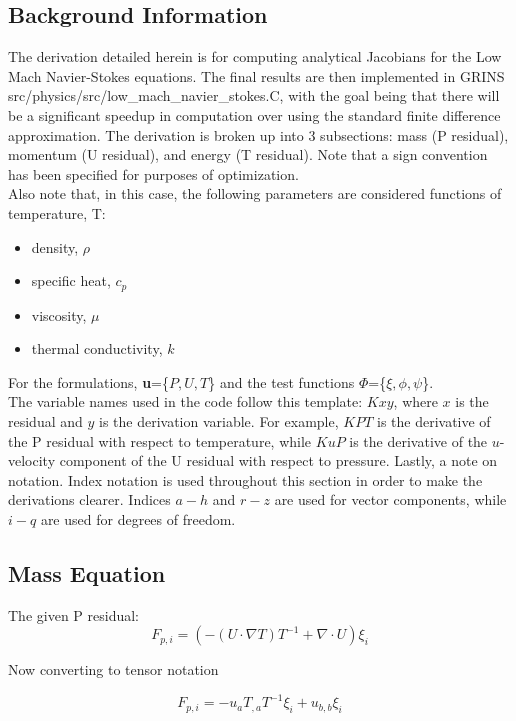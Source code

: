 \subsection{Background Information}
The derivation detailed herein is for computing analytical Jacobians for the Low Mach Navier-Stokes equations. The final results are then implemented in GRINS src/physics/src/low\_mach\_navier\_stokes.C, with the goal being that there
will be a significant speedup in computation over using the standard finite difference approximation. The derivation is broken up into 3 subsections: mass (P residual), momentum (U residual), and energy (T residual).
Note that a sign convention has been specified for purposes of optimization.\\
Also note that, in this case, the following parameters are considered functions of temperature, T:
\begin{itemize}
    \item density, $\rho$
    \item specific heat, $c_p$
    \item viscosity, $\mu$
    \item thermal conductivity, $k$
\end{itemize}
For the formulations, \textbf{u}=\{$P,U,T$\} and the test functions \textbf{$\Phi$}=\{$\xi,\phi,\psi$\}.\\
The variable names used in the code follow this template: $Kxy$, where $x$ is the residual and $y$ is the derivation variable.  For example, $KPT$ is the derivative of the P residual with respect to temperature,
while $KuP$ is the derivative of the $u$-velocity component of the U residual with respect to pressure. \newline
Lastly, a note on notation. Index notation is used throughout this section in order to make the derivations clearer. Indices $a-h$ and $r-z$ are used for vector components, while $i-q$ are used for degrees of freedom.

\newpage
\subsection{Mass Equation}
The given P residual:
\begin{equation}
    F_{p,i} = (-(U \cdot \nabla T) T^{-1} + \nabla \cdot U)\xi_i
\end{equation}

Now converting to tensor notation

\begin{equation}
    F_{p,i} = -u_a T_{,a} T^{-1} \xi_i + u_{b,b}\xi_i
\end{equation}

